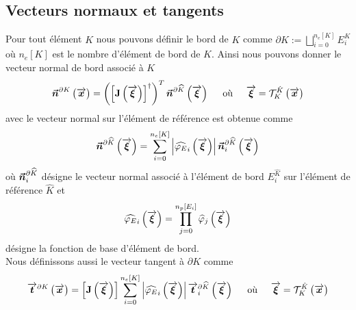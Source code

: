 \subsection{Vecteurs normaux et tangents}
\noindent Pour tout élément $K$ nous pouvons définir le bord de $K$ comme $\displaystyle \partial K := \bigsqcup_{i=0}^{n_e[K]} E_i^{K}$ où $n_e[K]$ est le nombre d'élément de bord de $K$. Ainsi nous pouvons donner le vecteur normal de bord associé à $K$
\begin{equation}
		\boldsymbol{\vec{n}}^{\partial K}\left(\overrightarrow{\boldsymbol{x}}\right) = \left(\left[\mathbf{J}\left(\overrightarrow{\boldsymbol{\xi}}\right)\right]^{\dagger }\right)^{T}\boldsymbol{\vec{n}}^{\partial \widehat{K}}\left(\overrightarrow{\boldsymbol{\xi}}\right)\hspace{5mm}\text{où}\hspace{5mm} \overrightarrow{\boldsymbol{\xi}} = \mathcal{T}^{\hat{K}}_{K} \left(\overrightarrow{\boldsymbol{x}}\right)
\end{equation}
avec le vecteur normal sur l'élément de référence est obtenue comme
\begin{equation}
\boldsymbol{\vec{n}}^{\partial \widehat{K}}\left(\overrightarrow{\boldsymbol{\xi}}\right) = \sum_{i=0}^{n_e[K]}\left|\widehat{\varphi_{E}}_{i}\left(\overrightarrow{\boldsymbol{\xi}}\right)\right|\boldsymbol{\vec{n}}^{\partial \widehat{K}}_i\left(\overrightarrow{\boldsymbol{\xi}}\right)
\end{equation}
où $\boldsymbol{\vec{n}}^{\partial \widehat{K}}_i$ désigne le vecteur normal associé à l'élément de bord $E_i^{\widehat{K}}$ sur l'élément de référence $\widehat{K}$ et 
\begin{equation}
	\widehat{\varphi_{E}}_{i}\left(\overrightarrow{\boldsymbol{\xi}}\right) =\prod_{j = 0}^{n_p[E_i]}\widehat{\varphi}_j\left(\overrightarrow{\boldsymbol{\xi}}\right)
\end{equation}
désigne la fonction de base d'élément de bord.\\
Nous définissons aussi le vecteur tangent à $\partial K$ comme
\begin{equation}
	\overrightarrow{\boldsymbol{t}}^{\partial K}\left(\overrightarrow{\boldsymbol{x}}\right) =\left[\mathbf{J}\left(\overrightarrow{\boldsymbol{\xi}}\right)\right]  \sum_{i=0}^{n_e[K]}\left|\widehat{\varphi_{E}}_{i}\left(\overrightarrow{\boldsymbol{\xi}}\right)\right|\overrightarrow{\boldsymbol{t}}^{\partial \widehat{K}}_i\left(\overrightarrow{\boldsymbol{\xi}}\right)\hspace{5mm}\text{où}\hspace{5mm} \overrightarrow{\boldsymbol{\xi}} = \mathcal{T}^{\hat{K}}_{K} \left(\overrightarrow{\boldsymbol{x}}\right)
\end{equation}
